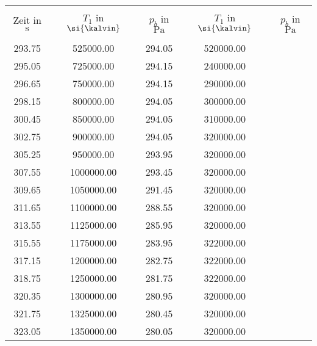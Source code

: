 \begin{minipage}{0.49	extwidth} 
 \centering 
 \begin{tabular}{S S S S S } 
 \toprule \\ 
Zeit in $\si{\second}$ & $T_1$ in $\si{\kalvin}$ & $p_b$ in $\si{\pascal}$ & $T_1$ in $\si{\kalvin}$ & $p_b$ in $\si{\pascal}$ \\ 
\midrule \\ 
 293.75 & 525000.00 & 294.05 & 520000.00 \\ 
295.05 & 725000.00 & 294.15 & 240000.00 \\ 
296.65 & 750000.00 & 294.15 & 290000.00 \\ 
298.15 & 800000.00 & 294.05 & 300000.00 \\ 
300.45 & 850000.00 & 294.05 & 310000.00 \\ 
302.75 & 900000.00 & 294.05 & 320000.00 \\ 
305.25 & 950000.00 & 293.95 & 320000.00 \\ 
307.55 & 1000000.00 & 293.45 & 320000.00 \\ 
309.65 & 1050000.00 & 291.45 & 320000.00 \\ 
311.65 & 1100000.00 & 288.55 & 320000.00 \\ 
313.55 & 1125000.00 & 285.95 & 320000.00 \\ 
315.55 & 1175000.00 & 283.95 & 322000.00 \\ 
317.15 & 1200000.00 & 282.75 & 322000.00 \\ 
318.75 & 1250000.00 & 281.75 & 322000.00 \\ 
320.35 & 1300000.00 & 280.95 & 320000.00 \\ 
321.75 & 1325000.00 & 280.45 & 320000.00 \\ 
323.05 & 1350000.00 & 280.05 & 320000.00 \\ 
\bottomrule 
 \end{tabular} 
 \label{tab: Temperaturen und Drücke} 
  \end{minipage}